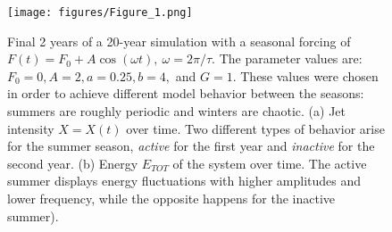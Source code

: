 \documentclass[%
 aip, cha,
 amsmath,amssymb,
 reprint,%
author-year,%
]{revtex4-1}
\newcommand{\0}{\mathbf 0}
\begin{document}
\begin{figure}[t!]
    \centering
    \texttt{[image: figures/Figure\_1.png]}
    \caption{Final 2 years of a 20-year simulation with a seasonal forcing of $F(t) = F_0 + A \cos(\omega t), \ \omega = {2\pi}/{\tau}$. The parameter values are: $F_0 = 0, A = 2, a = 0.25, b = 4,$ and $G = 1.$ These values were chosen in order to achieve different model behavior between the seasons: summers are roughly periodic and winters are chaotic. (a) Jet intensity $X = X(t)$ over time. Two different types of behavior arise for the summer season, \textit{active} for the first year and \textit{inactive} for the second year. (b) Energy $E_{TOT}$ of the system over time. The active summer displays energy fluctuations with higher amplitudes and lower frequency, while the opposite happens for the inactive summer). }
    \label{fig:timeseries}
    \vspace{-10pt}
\end{figure}
\end{document}
